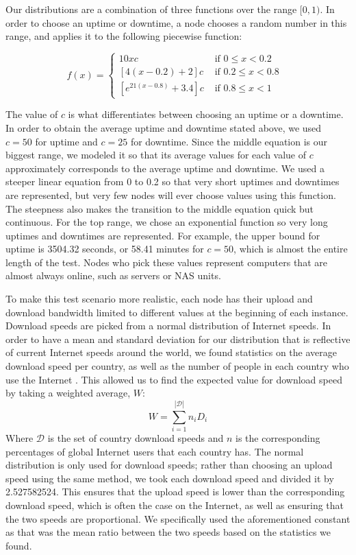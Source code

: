 \documentclass[12pt]{report}
\begin{document}
Our distributions are a combination of three functions over the range $[0,1)$. In order to choose an uptime or downtime, a node chooses a random number in this range, and applies it to the following piecewise function:

$$
f(x)=
\begin{cases}
10xc & \mbox{ if $0 \leq x < 0.2$ } \\
[4(x-0.2)+2]c & \mbox{ if $0.2 \leq x < 0.8$ } \\
[e^{21(x-0.8)}+3.4]c & \mbox{ if $0.8 \leq x < 1$ }
\end{cases}
$$

The value of $c$ is what differentiates between choosing an uptime or a downtime. In order to obtain the average uptime and downtime stated above, we used $c=50$ for uptime and $c=25$ for downtime. Since the middle equation is our biggest range, we modeled it so that its average values for each value of $c$ approximately corresponds to the average uptime and downtime. We used a steeper linear equation from 0 to 0.2 so that very short uptimes and downtimes are represented, but very few nodes will ever choose values using this function. The steepness also makes the transition to the middle equation quick but continuous. For the top range, we chose an exponential function so very long uptimes and downtimes are represented. For example, the upper bound for uptime is 3504.32 seconds, or 58.41 minutes for $c=50$, which is almost the entire length of the test. Nodes who pick these values represent computers that are almost always online, such as servers or NAS units.

To make this test scenario more realistic, each node has their upload and download bandwidth limited to different values at the beginning of each instance. Download speeds are picked from a normal distribution of Internet speeds. In order to have a mean and standard deviation for our distribution that is reflective of current Internet speeds around the world, we found statistics on the average download speed per country, as well as the number of people in each country who use the Internet \cite{internetUsersByCountry,downloadSpeedsByCountry}. This allowed us to find the expected value for download speed by taking a weighted average, $W$:
$$
W=\sum\limits_{i=1}^{|\mathcal{D}|} n_iD_i
$$
Where $\mathcal{D}$ is the set of country download speeds and $n$ is the corresponding percentages of global Internet users that each country has. The normal distribution is only used for download speeds; rather than choosing an upload speed using the same method, we took each download speed and divided it by 2.527582524. This ensures that the upload speed is lower than the corresponding download speed, which is often the case on the Internet, as well as ensuring that the two speeds are proportional. We specifically used the aforementioned constant as that was the mean ratio between the two speeds based on the statistics we found.
\end{document}
